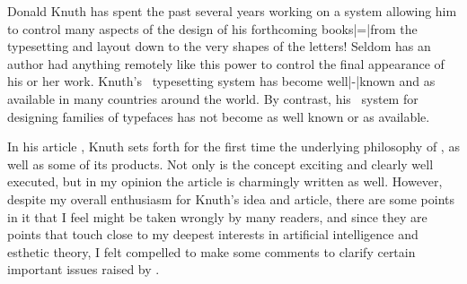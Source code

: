 Donald Knuth has spent the past several years working on a
system allowing him to control many aspects of the design
of his forthcoming books|=|from the typesetting and layout
down to the very shapes of the letters! Seldom has an
author had anything remotely like this power to control the
final appearance of his or her work. Knuth's \TEX\
typesetting system has become well|-|known and as available in
many countries around the world. By contrast, his
\METAFONT\ system for designing families of typefaces has
not become as well known or as available.

In his article ,
Knuth sets forth for the first time the underlying
philosophy of \METAFONT, as well as some of its products.
Not only is the concept exciting and clearly well executed,
but in my opinion the article is charmingly written as well.
However, despite my overall enthusiasm for Knuth's idea and
article, there are some points in it that I feel might be
taken wrongly by many readers, and since they are points
that touch close to my deepest interests in artificial
intelligence and esthetic theory, I felt compelled to make
some comments to clarify certain important issues raised by
.
